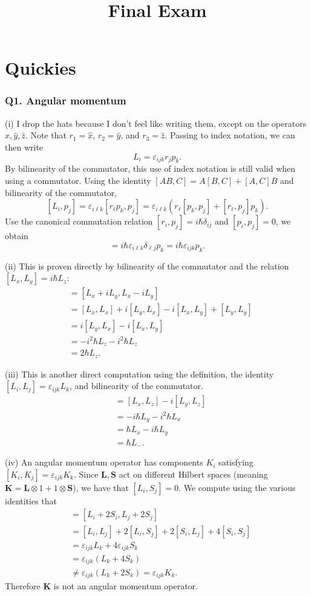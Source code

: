 \documentclass[11pt, letterpaper]{article}
\title{Final Exam}
\begin{document}
\makeproblem
\part{Quickies}
\section{Q1. Angular momentum}
(i) I drop the hats because I don't feel like writing them, except on the operators $\hat{x} ,\hat{y} ,\hat{z} $. Note that $r_1=\hat{x} $, $r_2=\hat{y} $, and $r_3=\hat{z} $. Passing to index notation, we can then write
\[
	L_i=\varepsilon _{ijk} r_jp_k
.\]
By bilinearity of the commutator, this use of index notation is still valid when using a commutator. Using the identity $[AB,C]=A[B,C]+[A,C]B$ and bilinearity of the commutator,
\[
	[L_i,p_j]=\varepsilon _{i\ell k} [r_\ell p_k,p_j]=\varepsilon _{i\ell k} \left( r_\ell [p_k,p_j]+[r_\ell ,p_j]p_k \right) 
.\]
Use the canonical commutation relation $[r_i,p_j]=i\hbar\delta_{ij} $ and $[p_i,p_j]=0$, we obtain
\[
	=i\hbar\varepsilon _{i\ell k} \delta _{\ell j} p_k= i\hbar\varepsilon _{ijk} p_k
.\]


(ii) This is proven directly by bilinearity of the commutator and the relation $[L_x,L_y]=i\hbar L_z$:
\begin{align*}
	[L_+,L_-]&=[L_x+iL_y,L_x-iL_y]\\
		 &=[L_x,L_x]+i[L_y,L_x]-i[L_x,L_y]+[L_y,L_y]\\
		 &=i[L_y,L_x]-i[L_x,L_y]\\
		 &=-i^2\hbar L_z - i^2\hbar L_z\\
		 &=2\hbar L_z
.\end{align*}

(iii) This is another direct computation using the definition, the identity $[L_i,L_j]=\varepsilon _{ijk} L_k$, and bilinearity of the commutator.
\begin{align*}
	[L_-,L_z]&=[L_x,L_z]-i[L_y,L_z]\\
		 &=-i\hbar L_y-i^2\hbar L_x\\
		 &=\hbar L_x-i\hbar L_y\\
		 &=\hbar L_-
.\end{align*}

(iv) An angular momentum operator has components $K_i$ satisfying $[K_i,K_j]=\varepsilon _{ijk} K_k$. Since $\mathbf{L} ,\mathbf{S} $ act on different Hilbert spaces (meaning $\mathbf{K} =\mathbf{L} \otimes 1+1\otimes \mathbf{S} $), we have that $[L_i,S_j]=0$. We compute using the various identities that
\begin{align*}
	[K_i,K_j]&=[L_i+2S_i,L_j+2S_j]\\
		 &=[L_i,L_j]+2[L_i,S_j]+2[S_i,L_j]+4[S_i,S_j]\\
		 &=\varepsilon_{ijk}L_k+4\varepsilon _{ijk} S_k\\
		 &=\varepsilon _{ijk} \left( L_k+4S_k \right) \\
		 &\neq \varepsilon _{ijk} \left( L_k+2S_k \right) =\varepsilon _{ijk} K_k
.\end{align*}
Therefore $\mathbf{K} $ is not an angular momentum operator.
\end{document}
